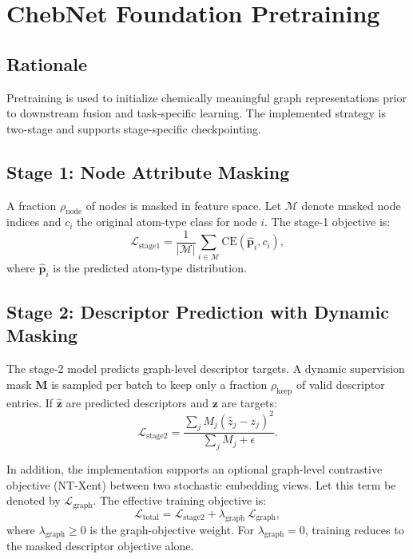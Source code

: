\documentclass[11pt,a4paper]{article}
\begin{document}
\section{ChebNet Foundation Pretraining}
\subsection{Rationale}
Pretraining is used to initialize chemically meaningful graph representations prior to downstream fusion and task-specific learning. The implemented strategy is two-stage and supports stage-specific checkpointing.

\subsection{Stage 1: Node Attribute Masking}
A fraction $\rho_{\text{node}}$ of nodes is masked in feature space. Let $\mathcal{M}$ denote masked node indices and $c_i$ the original atom-type class for node $i$. The stage-1 objective is:
\begin{equation}
\mathcal{L}_{\text{stage1}} = \frac{1}{|\mathcal{M}|} \sum_{i \in \mathcal{M}} \mathrm{CE}(\hat{\mathbf{p}}_i, c_i),
\end{equation}
where $\hat{\mathbf{p}}_i$ is the predicted atom-type distribution.

\subsection{Stage 2: Descriptor Prediction with Dynamic Masking}
The stage-2 model predicts graph-level descriptor targets. A dynamic supervision mask $\mathbf{M}$ is sampled per batch to keep only a fraction $\rho_{\text{keep}}$ of valid descriptor entries. If $\hat{\mathbf{z}}$ are predicted descriptors and $\mathbf{z}$ are targets:
\begin{equation}
\mathcal{L}_{\text{stage2}} = \frac{\sum_j M_j (\hat{z}_j - z_j)^2}{\sum_j M_j + \epsilon}.
\end{equation}

In addition, the implementation supports an optional graph-level contrastive objective (NT-Xent) between two stochastic embedding views. Let this term be denoted by $\mathcal{L}_{\text{graph}}$. The effective training objective is:
\begin{equation}
\mathcal{L}_{\text{total}} = \mathcal{L}_{\text{stage2}} + \lambda_{\text{graph}}\,\mathcal{L}_{\text{graph}},
\end{equation}
where $\lambda_{\text{graph}} \ge 0$ is the graph-objective weight. For $\lambda_{\text{graph}}=0$, training reduces to the masked descriptor objective alone.
\end{document}
